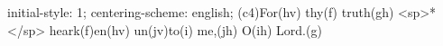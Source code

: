 initial-style: 1;
centering-scheme: english;
(c4)For(hv) thy(f) truth(gh) <sp>*</sp> heark(f)en(hv) un(jv)to(i) me,(jh) O(ih) Lord.(g)

